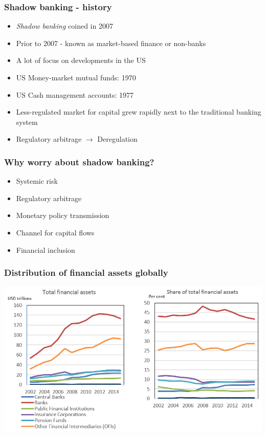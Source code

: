 \documentclass[11pt]{beamer}
\begin{document}
\begin{frame}
\frametitle{Shadow banking - history}
\begin{itemize}
\item \textit{Shadow banking} coined in 2007
\item Prior to 2007 - known as market-based finance or non-banks
\item A lot of focus on developments in the US
\item US Money-market mutual funds: 1970
\item US Cash management accounts: 1977
\item Less-regulated market for capital grew rapidly next to the traditional banking system
\item Regulatory arbitrage
$\rightarrow$ Deregulation
\end{itemize}
\end{frame}

\begin{frame}
\frametitle{Why worry about shadow banking?}
\begin{itemize}
\item Systemic risk
\item Regulatory arbitrage
\item Monetary policy transmission
\item Channel for capital flows
\item Financial inclusion
\end{itemize}
\end{frame}

\begin{frame}
\frametitle{Distribution of financial assets globally}
\includegraphics[width=\textwidth]{Figures/shadowbank5.png}
\end{frame}
\end{document}
